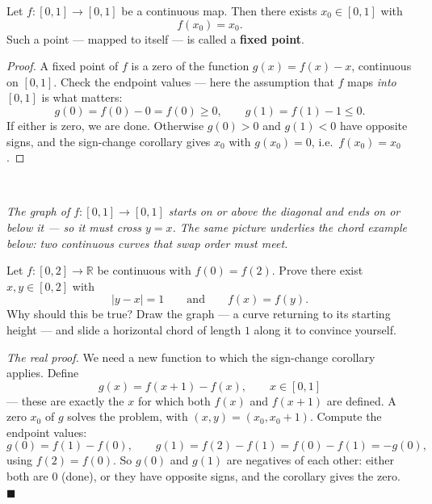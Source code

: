 \documentclass[11pt]{report}
\newcommand{\figcap}[1]{\\[1.5mm]\parbox{0.92\textwidth}{\small\itshape #1}}
\begin{document}
\begin{thmbox}
Let $f: [0,1] \to [0,1]$ be a continuous map. Then there exists $x_0 \in [0,1]$ with
\[
f(x_0) = x_0.
\]
Such a point --- mapped to itself --- is called a \textbf{fixed point}.
\end{thmbox}

\begin{proof}
A fixed point of $f$ is a zero of the function $g(x) = f(x) - x$, continuous on $[0,1]$. Check the endpoint values --- here the assumption that $f$ maps \emph{into} $[0,1]$ is what matters:
\[
g(0) = f(0) - 0 = f(0) \geq 0, \qquad g(1) = f(1) - 1 \leq 0.
\]
If either is zero, we are done. Otherwise $g(0) > 0$ and $g(1) < 0$ have opposite signs, and the sign-change corollary gives $x_0$ with $g(x_0) = 0$, i.e.\ $f(x_0) = x_0$.
\end{proof}

\begin{center}
\figcap{The graph of $f: [0,1] \to [0,1]$ starts on or above the diagonal and ends on or below it --- so it must cross $y = x$. The same picture underlies the chord example below: two continuous curves that swap order must meet.}
\end{center}


\begin{exbox}
Let $f: [0,2] \to \mathbb{R}$ be continuous with $f(0) = f(2)$. Prove there exist $x, y \in [0,2]$ with
\[
|y - x| = 1 \qquad \text{and} \qquad f(x) = f(y).
\]
Why should this be true? Draw the graph --- a curve returning to its starting height --- and slide a horizontal chord of length $1$ along it to convince yourself.

\emph{The real proof.} We need a new function to which the sign-change corollary applies. Define
\[
g(x) = f(x+1) - f(x), \qquad x \in [0,1]
\]
--- these are exactly the $x$ for which both $f(x)$ and $f(x+1)$ are defined. A zero $x_0$ of $g$ solves the problem, with $(x, y) = (x_0, x_0 + 1)$. Compute the endpoint values:
\[
g(0) = f(1) - f(0), \qquad
g(1) = f(2) - f(1) = f(0) - f(1) = -g(0),
\]
using $f(2) = f(0)$. So $g(0)$ and $g(1)$ are negatives of each other: either both are $0$ (done), or they have opposite signs, and the corollary gives the zero. \hfill $\blacksquare$
\end{exbox}
\end{document}
